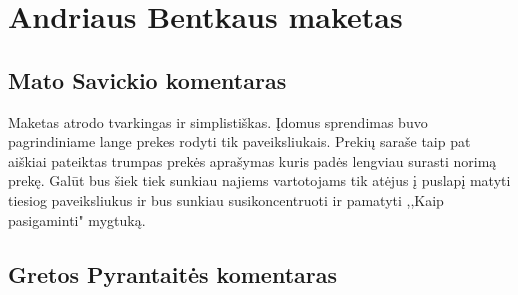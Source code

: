 \documentclass[oneside]{VUMIFPSkursinis}
\begin{document}
\section{Andriaus Bentkaus maketas}
	\subsection{Mato Savickio komentaras}
Maketas atrodo tvarkingas ir simplistiškas. Įdomus sprendimas buvo pagrindiniame lange prekes rodyti tik paveiksliukais. Prekių saraše taip pat aiškiai pateiktas trumpas prekės aprašymas kuris padės lengviau surasti norimą prekę. Galūt bus šiek tiek sunkiau najiems vartotojams tik atėjus į puslapį matyti tiesiog paveiksliukus ir bus sunkiau susikoncentruoti ir pamatyti ,,Kaip pasigaminti" mygtuką.
	\subsection{Gretos Pyrantaitės komentaras}
\end{document}
